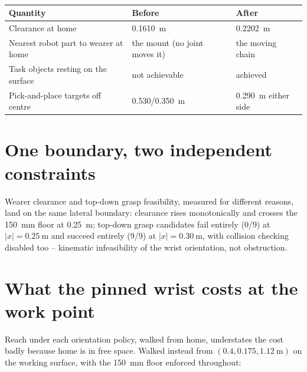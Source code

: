 \begin{table}[htbp]
  \centering
  \caption[Before and after the mount change]{}
  \label{tab:mountapplied}
  \begin{tabular}{@{}lll@{}}
    \toprule
    Quantity & Before & After \\
    \midrule
    Clearance at home & \SI{0.1610}{\metre} & \SI{0.2202}{\metre} \\
    Nearest robot part to wearer at home & the mount (no joint moves it) & the moving chain \\
    Task objects resting on the surface & not achievable & achieved \\
    Pick-and-place targets off centre & \SI{0.530}{}/\SI{0.350}{\metre} & \SI{0.290}{\metre} either side \\
    \bottomrule
  \end{tabular}
\end{table}

\section{One boundary, two independent constraints}

Wearer clearance and top-down grasp feasibility, measured for different
reasons, land on the same lateral boundary: clearance rises monotonically
and crosses the \SI{150}{\milli\metre} floor at \SI{0.25}{\metre}; top-down
grasp candidates fail entirely (0/9) at $|x|=\SI{0.25}{\metre}$ and succeed
entirely (9/9) at $|x|=\SI{0.30}{\metre}$, with collision checking disabled
too -- kinematic infeasibility of the wrist orientation, not obstruction.

\section{What the pinned wrist costs at the work point}
\label{sec:work-point}

Reach under each orientation policy, walked from home, understates the cost
badly because home is in free space. Walked instead from
$(0.4,0.175,\SI{1.12}{\metre})$ on the working surface, with the
\SI{150}{\milli\metre} floor enforced throughout:

